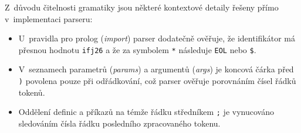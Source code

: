 \documentclass[]{ifjclass}
\begin{document}
Z~důvodu čitelnosti gramatiky jsou některé kontextové detaily řešeny přímo v~implementaci parseru:
\begin{itemize}\setlength{\itemsep}{2pt}\setlength{\parskip}{0pt}
    \item U~pravidla pro prolog (\textit{import}) parser dodatečně ověřuje, že identifikátor má přesnou hodnotu \texttt{ifj26} a že za symbolem \texttt{*} následuje \texttt{EOL} nebo \texttt{\$}.
    \item V~seznamech parametrů (\textit{params}) a argumentů (\textit{args}) je koncová čárka před \texttt{)} povolena pouze při odřádkování, což parser ověřuje porovnáním čísel řádků tokenů.
    \item Oddělení definic a příkazů na témže řádku středníkem \texttt{;} je vynucováno sledováním čísla řádku posledního zpracovaného tokenu.
\end{itemize}
\end{document}
